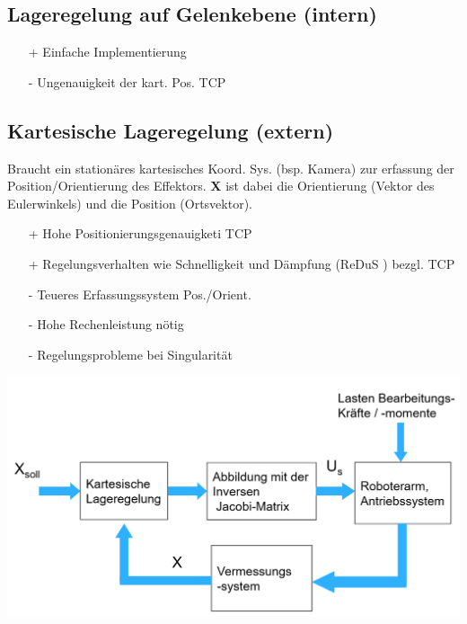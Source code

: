     \subsection{Lageregelung auf Gelenkebene (intern)}
    \begin{multicols}{2}
        \begin{itemize}
            \item[+] Einfache Implementierung
            \item[-] Ungenauigkeit der kart. Pos. TCP
        \end{itemize}
    \end{multicols}
\begin{minipage}{0.5\linewidth}
    \subsection{Kartesische Lageregelung (extern)}
    Braucht ein stationäres kartesisches Koord. Sys. (bsp. Kamera) zur erfassung der Position/Orientierung des Effektors. \textbf{X} ist dabei die Orientierung (Vektor des Eulerwinkels) und die Position (Ortsvektor).
    \begin{itemize}
        \item[+] Hohe Positionierungsgenauigketi TCP
        \item[+] Regelungsverhalten wie Schnelligkeit und Dämpfung (ReDuS ) bezgl. TCP
        \item[-] Teueres Erfassungssystem Pos./Orient.
        \item[-] Hohe Rechenleistung nötig
        \item[-] Regelungsprobleme bei Singularität
    \end{itemize}
    
\end{minipage}
\begin{minipage}{0.5\linewidth}
    \includegraphics[width=\linewidth]{./bilder/KartLageRegelung}
\end{minipage}

